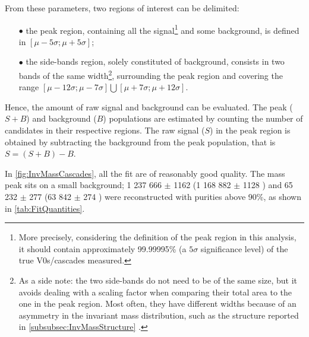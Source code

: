 From these parameters, two regions of interest can be delimited:
\begin{itemize}
\item[$\bullet$] the peak region, containing all the signal\footnote{More precisely, considering the definition of the peak region in this analysis, it should contain approximately 99.99995\% (\ie a $5 \sigma$ significance level) of the true V0s/cascades measured.} and some background, is defined in $\left[ \mu - 5 \sigma ; \mu + 5 \sigma \right]$;
\item[$\bullet$] the side-bands region, solely constituted of background, consists in two bands of the same width\footnote{As a side note: the two side-bands do not need to be of the same size, but it avoids dealing with a scaling factor when comparing their total area to the one in the peak region. Most often, they have different widths because of an asymmetry in the invariant mass distribution, such as the structure reported in \Sec\ref{subsubsec:InvMassStructure} \cite{alicecollaborationProductionLightflavorHadrons2020}.}, surrounding the peak region and covering the range $\left[ \mu - 12 \sigma ; \mu - 7 \sigma \right] \bigcup \left[ \mu + 7 \sigma ; \mu + 12 \sigma \right]$.
\end{itemize}
Hence, the amount of raw signal and background can be evaluated. The peak ($S+B$) and background ($B$) populations are estimated by counting the
number of candidates in their respective regions. The raw signal ($S$) in the peak region is obtained by subtracting the background from the peak population, that is $S = (S+B) - B$.

In \figs\ref{fig:InvMassCascades}, all the fit are of reasonably good quality. The mass peak sits on a small background; 1 237 666 $\pm$ 1162 \rmXiM (1 168 882 $\pm$ 1128 \rmAxiP) and 65 232 $\pm$ 277 \rmOmegaM (63 842 $\pm$ 274 \rmAomegaP) were reconstructed with purities above 90\%, as shown in \tab\ref{tab:FitQuantities}.

